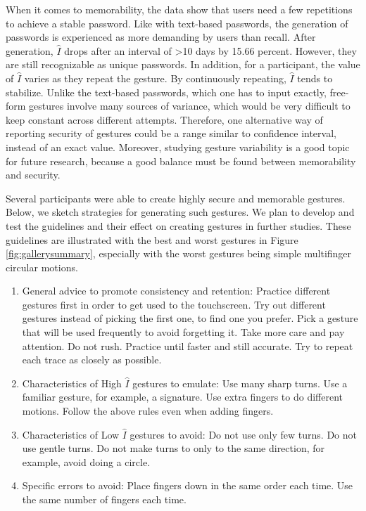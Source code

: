 \documentclass{sig-alternate-10pt}
\begin{document}
When it comes to memorability, the data show that users need a few repetitions to achieve a stable password. Like with text-based passwords, the generation of passwords is experienced as more demanding by users than recall. After generation, $\hat{I}$ drops after an interval of >10 days by 15.66 percent. However, they are still recognizable as unique passwords. In addition, for a participant, the value of $\hat{I}$ varies as they repeat the gesture. By continuously repeating, $\hat{I}$ tends to stabilize. Unlike the text-based passwords, which one has to input exactly, free-form gestures involve many sources of variance, which would be very difficult to keep constant across different attempts. Therefore, one alternative way of reporting security of gestures could be a range similar to confidence interval, instead of an exact value. Moreover, studying gesture variability is a good topic for future research, because a good balance must be found between memorability and security.



Several participants were able to create highly secure and memorable gestures. Below, we sketch strategies for generating such gestures. We plan to develop and test the guidelines and their effect on creating gestures in further studies.
These guidelines are illustrated with the best and worst gestures in Figure \ref{fig:gallerysummary}, especially with the worst gestures being simple multifinger circular motions.


\begin{enumerate}
\item General advice to promote consistency and retention: Practice different gestures first in order to get used to the touchscreen. Try out different gestures instead of picking the first one, to find one you prefer. Pick a gesture that will be used frequently to avoid forgetting it. Take more care and pay attention. Do not rush. Practice until faster and still accurate. Try to repeat each trace as closely as possible.
\item Characteristics of High $\hat{I}$ gestures to emulate: Use many sharp turns. Use a familiar gesture, for example, a signature. Use extra fingers to do different motions. Follow the above rules even when adding fingers.
\item Characteristics of Low $\hat{I}$ gestures to avoid: Do not use only few turns. Do not use gentle turns. Do not make turns to only to the same direction, for example, avoid doing a circle. 
\item Specific errors to avoid: Place fingers down in the same order each time. Use the same number of fingers each time.
\end{enumerate}
\end{document}
